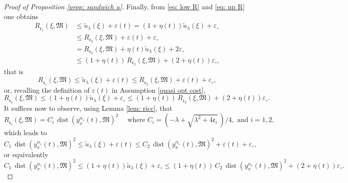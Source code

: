 \documentclass[12pt]{amsart}
\numberwithin{equation}{section}
\theoremstyle{plain}
\begin{document}
\begin{proof}[Proof of Proposition \ref{prop: sandwich u}]
Finally, from \eqref{eq: low R} and \eqref{eq: up R} one obtains
\begin{equation*}
\begin{aligned}
    R_{\mathfrak{c}_{1}}(\xi, \mathfrak{M}) 
    & \leq \tilde{u}_{\lambda}(\xi) + \varepsilon(t) 
    = (1+\eta(t))\tilde{u}_{\lambda}(\xi) + \varepsilon_{\circ}\\
    & \leq R_{\mathfrak{c}_{2}}(\xi, \mathfrak{M}) + \varepsilon(t)+\varepsilon_{\circ} \\
    & = R_{\mathfrak{c}_{2}}(\xi, \mathfrak{M})+ \eta(t)\tilde{u}_{\lambda}(\xi) +2\varepsilon_{\circ} \\
    & \leq  (1+\eta(t))\,R_{\mathfrak{c}_{2}}(\xi, \mathfrak{M}) + (2+ \eta(t))\varepsilon_{\circ},
\end{aligned}
\end{equation*}
that is
\begin{equation*}
    R_{\mathfrak{c}_{1}}(\xi, \mathfrak{M}) 
    \leq \tilde{u}_{\lambda}(\xi) + \varepsilon(t) 
    \leq R_{\mathfrak{c}_{2}}(\xi, \mathfrak{M}) + \varepsilon(t)+\varepsilon_{\circ},
\end{equation*}
or, recalling the definition of $\varepsilon(t)$ in Assumption \ref{quasi opt cost}, 
\begin{equation*}
    R_{\mathfrak{c}_{1}}(\xi, \mathfrak{M}) 
    \leq (1+\eta(t))\tilde{u}_{\lambda}(\xi) + \varepsilon_{\circ} 
    \leq (1+\eta(t))\,R_{\mathfrak{c}_{2}}(\xi, \mathfrak{M}) + (2+ \eta(t))\varepsilon_{\circ}.
\end{equation*}
It suffices now to observe, using Lemma \ref{lem: ricc}, that
\begin{equation*}
    R_{\mathfrak{c}_{i}}(\xi,\mathfrak{M}) = C_{i}\,\operatorname{dist}(y_{x}^{\alpha_{\varepsilon}}(t),\mathfrak{M})^{2} \quad \text{ where }  C_{i} = (-\lambda + \sqrt{\lambda^{2} + 4\mathfrak{c}_{i}}\,)/4, \text{ and } i=1,2,
\end{equation*}
which leads to
\begin{equation*}
    C_{1}\,\operatorname{dist}(y_{x}^{\alpha_{\varepsilon}}(t),\mathfrak{M})^{2} 
    \leq \tilde{u}_{\lambda}(\xi) + \varepsilon(t) 
    \leq C_{2}\,\operatorname{dist}(y_{x}^{\alpha_{\varepsilon}}(t),\mathfrak{M})^{2} + \varepsilon(t)+\varepsilon_{\circ},
\end{equation*}
or equivalently
\begin{equation*}
    C_{1}\,\operatorname{dist}(y_{x}^{\alpha_{\varepsilon}}(t),\mathfrak{M})^{2}
    \leq (1+\eta(t))\tilde{u}_{\lambda}(\xi) + \varepsilon_{\circ} 
    \leq (1+\eta(t))\,C_{2}\,\operatorname{dist}(y_{x}^{\alpha_{\varepsilon}}(t),\mathfrak{M})^{2} + (2+ \eta(t))\varepsilon_{\circ}.
\end{equation*}
\end{proof}
\end{document}
